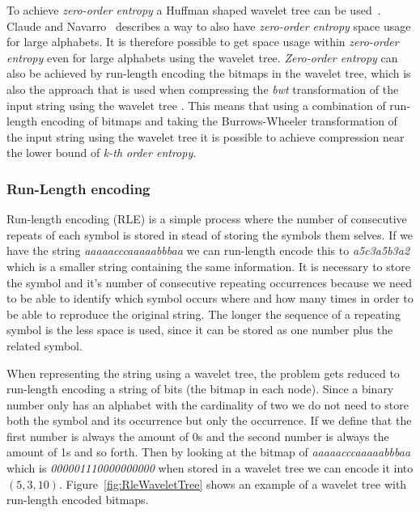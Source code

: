 To achieve \textit{zero-order entropy} a Huffman shaped wavelet tree can be used~\citep[Section~4]{FMcountOnBWT}. Claude and Navarro~\citep[Section~3]{Claude08practicalrankselect} describes a way to also have \textit{zero-order entropy} space usage for large alphabets. 
It is therefore possible to get space usage within \textit{zero-order entropy} even for large alphabets using the wavelet tree. 
\textit{Zero-order entropy} can also be achieved by run-length encoding the bitmaps in the wavelet tree, which is also the approach that is used when compressing the \textit{bwt} transformation of the input string using the wavelet tree \citep[Introduction (\textbf{B})]{waveletTreeEntropy}.
This means that using a combination of run-length encoding of bitmaps and taking the Burrows-Wheeler transformation of the input string using the wavelet tree it is possible to achieve compression near the lower bound of \textit{k-th order entropy}.

\subsubsection{Run-Length encoding}
Run-length encoding (RLE) is a simple process where the number of consecutive repeats of each symbol is stored in stead of storing the symbols them selves. 
If we have the string \textit{aaaaacccaaaaabbbaa} we can run-length encode this to \textit{a5c3a5b3a2} which is a smaller string containing the same information.
It is necessary to store the symbol and it's number of consecutive repeating occurrences because we need to be able to identify which symbol occurs where and how many times in order to be able to reproduce the original string.
The longer the sequence of a repeating symbol is the less space is used, since it can be stored as one number plus the related symbol.

When representing the string using a wavelet tree, the problem gets reduced to run-length encoding a string of bits (the bitmap in each node).
Since a binary number only has an alphabet with the cardinality of two we do not need to store both the symbol and its occurrence but only the occurrence.
If we define that the first number is always the amount of 0s and the second number is always the amount of 1s and so forth. 
Then by looking at the bitmap of \textit{aaaaacccaaaaabbbaa} which is \textit{000001110000000000} when stored in a wavelet tree we can encode it into $(5,3,10)$.
Figure~\ref{fig:RleWaveletTree} shows an example of a wavelet tree with run-length encoded bitmaps.

